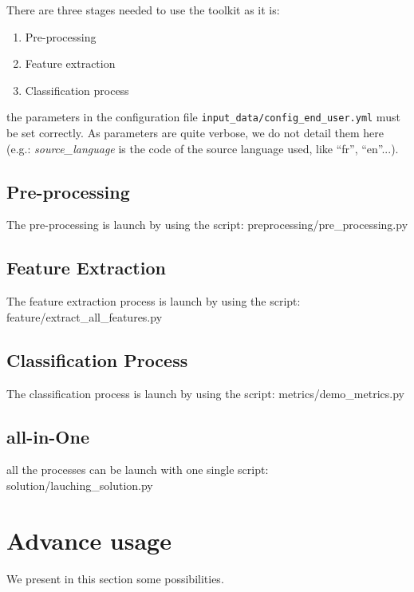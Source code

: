 \documentclass[a4paper,12pt]{article}
\begin{document}
There are three stages needed to use the toolkit as it is:
\begin{enumerate}
 \item Pre-processing
 \item Feature extraction
 \item Classification process
\end{enumerate}

the parameters in the configuration file 
\texttt{input\_data/config\_end\_user.yml} must be set correctly. As parameters 
are quite verbose, we do not detail them here (e.g.: \textit{source\_language} is 
the code of the source language used, like ``fr'', ``en''...).


\subsection{Pre-processing}

The pre-processing is launch by using the script: preprocessing/pre\_processing.py

\subsection{Feature Extraction}

The feature extraction process is launch by using the script: feature/extract\_all\_features.py

\subsection{Classification Process}

The classification process is launch by using the script: metrics/demo\_metrics.py

\subsection{all-in-One}

all the processes can be launch with one single script: solution/lauching\_solution.py
  
\section{Advance usage}

We present in this section some possibilities.
\end{document}
